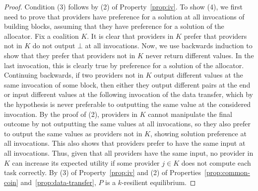 \begin{proof}
Condition (3) follows by (2) of Property~\ref{prop:iv}.
To show (4), we first need to prove that providers have preference for a solution at all invocations
of building blocks, assuming that they have preference for a solution of the allocator.
Fix a coalition $K$. It is clear that providers in $K$ prefer that providers not in $K$
do not output $\bot$ at all invocations. Now, we use backwards induction to show
that they prefer that providers not in $K$ never return different values.
In the last invocation, this is clearly true by preference for a solution of the allocator.
Continuing backwards, if two providers not in $K$ output different values
at the same invocation of some block, then either they output different pairs at the end or 
input different values at the following invocation of the data transfer,
which by the hypothesis is never preferable to outputting the same value at the considered invocation.
By the proof of (2), providers in $K$ cannot manipulate the final outcome
by not outputting the same values at all invocations, so
they also prefer to output the same values as providers not in $K$,
showing solution preference at all invocations. This also shows that
providers prefer to have the same input at all invocations.
Thus, given that all providers have the same input,
no provider in $K$ can increase its expected utility
if some provider $j \in K$ does not compute each task correctly.
By (3) of Property~\ref{prop:iv} and 
(2) of Properties~\ref{prop:common-coin} and~\ref{prop:data-transfer},
$P$ is a $k$-resilient equilibrium.
\end{proof}
